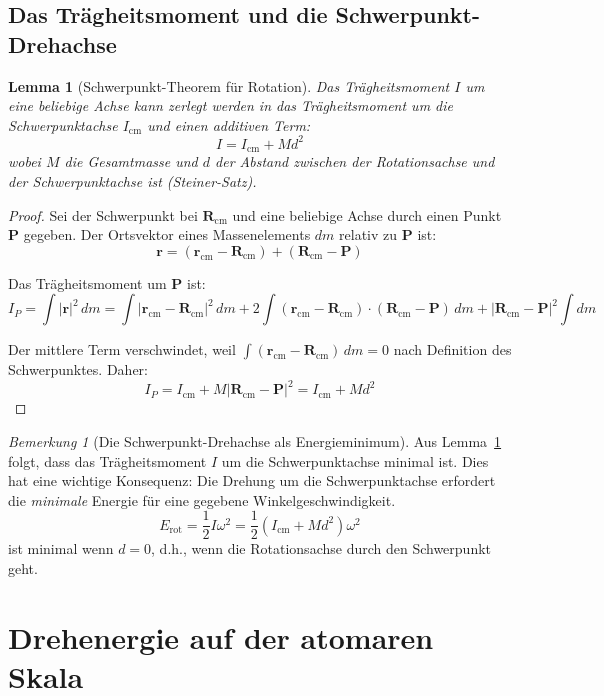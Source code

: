 \documentclass[12pt,a4paper]{report}
\theoremstyle{plain}
\newtheorem{lemma}[theorem]{Lemma}
\theoremstyle{definition}
\theoremstyle{remark}
\newtheorem{bemerkung}[theorem]{Bemerkung}
\begin{document}
\section{Das Trägheitsmoment und die Schwerpunkt-Drehachse}

\begin{lemma}[Schwerpunkt-Theorem für Rotation]
	\label{lem:schwerpunkt_rotation}
	Das Trägheitsmoment $I$ um eine beliebige Achse kann zerlegt werden in das Trägheitsmoment um die Schwerpunktachse $I_{\text{cm}}$ und einen additiven Term:
	\[
	I = I_{\text{cm}} + M d^2
	\]
	wobei $M$ die Gesamtmasse und $d$ der Abstand zwischen der Rotationsachse und der Schwerpunktachse ist (Steiner-Satz).
\end{lemma}

\begin{proof}
	Sei der Schwerpunkt bei $\mathbf{R}_{\text{cm}}$ und eine beliebige Achse durch einen Punkt $\mathbf{P}$ gegeben. Der Ortsvektor eines Massenelements $dm$ relativ zu $\mathbf{P}$ ist:
	\[
	\mathbf{r} = (\mathbf{r}_{\text{cm}} - \mathbf{R}_{\text{cm}}) + (\mathbf{R}_{\text{cm}} - \mathbf{P})
	\]
	
	Das Trägheitsmoment um $\mathbf{P}$ ist:
	\[
	I_P = \int |\mathbf{r}|^2 \, dm = \int |\mathbf{r}_{\text{cm}} - \mathbf{R}_{\text{cm}}|^2 \, dm + 2\int (\mathbf{r}_{\text{cm}} - \mathbf{R}_{\text{cm}}) \cdot (\mathbf{R}_{\text{cm}} - \mathbf{P}) \, dm + |\mathbf{R}_{\text{cm}} - \mathbf{P}|^2 \int dm
	\]
	
	Der mittlere Term verschwindet, weil $\int (\mathbf{r}_{\text{cm}} - \mathbf{R}_{\text{cm}}) \, dm = 0$ nach Definition des Schwerpunktes. Daher:
	\[
	I_P = I_{\text{cm}} + M |\mathbf{R}_{\text{cm}} - \mathbf{P}|^2 = I_{\text{cm}} + M d^2
	\]
\end{proof}

\begin{bemerkung}[Die Schwerpunkt-Drehachse als Energieminimum]
	Aus Lemma~\ref{lem:schwerpunkt_rotation} folgt, dass das Trägheitsmoment $I$ um die Schwerpunktachse minimal ist. Dies hat eine wichtige Konsequenz: Die Drehung um die Schwerpunktachse erfordert die \emph{minimale} Energie für eine gegebene Winkelgeschwindigkeit.
	\[
	E_{\text{rot}} = \frac{1}{2} I \omega^2 = \frac{1}{2} (I_{\text{cm}} + M d^2) \omega^2
	\]
	ist minimal wenn $d = 0$, d.h., wenn die Rotationsachse durch den Schwerpunkt geht.
\end{bemerkung}

\chapter{Drehenergie auf der atomaren Skala}
\end{document}
